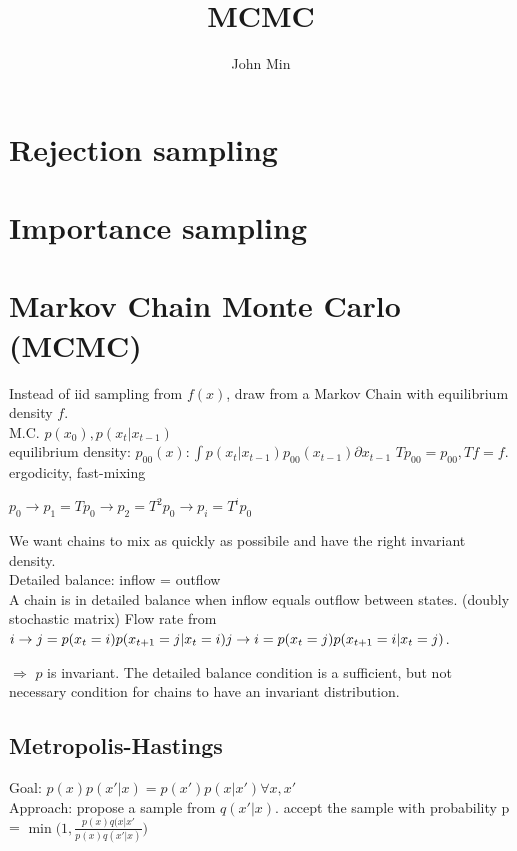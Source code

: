 \documentclass{article}
\author{John Min}
\title{MCMC}
\newcommand{\dx}{\partial x}
\begin{document}
\maketitle

\section{Rejection sampling}

\section{Importance sampling}

\section{Markov Chain Monte Carlo (MCMC)}

Instead of iid sampling from $f(x)$, draw from a Markov Chain with equilibrium density $f$. \\

\noindent
M.C.
$p(x_0), p(x_t | x_{t-1})$ \\
equilibrium density:  $ p_{00}(x): \int p(x_t | x_{t-1}) p_{00}(x_{t-1}) \dx_{t-1} $
$T p_{00} = p_{00}, Tf = f$. 
ergodicity, fast-mixing

$p_0 \rightarrow p_1 = T p_0 \rightarrow p_2 = T^2 p_0 \rightarrow p_i = T^i p_0$

\noindent
We want chains to mix as quickly as possibile and have the right invariant density. \\

\noindent
Detailed balance:  inflow = outflow \\
A chain is in detailed balance when inflow equals outflow between states.  (doubly stochastic matrix)
Flow rate from $i \rightarrow j = p(x_t = i) p(x_{t+1} = j | x_t = i) \\
j \rightarrow i = p(x_t = j) p(x_{t+1} = i | x_t = j) $.

$\Rightarrow $ $p$ is invariant.
The detailed balance condition is a sufficient, but not necessary condition for chains to have an invariant distribution.

\subsection{Metropolis-Hastings}
Goal:  $p(x) p(x' | x) = p(x') p(x | x') \forall x, x'$ \\
Approach:  propose a sample from $q(x' | x)$.
		  accept the sample with probability p = $\min \Big(1, \frac{p(x) q(x | x'}{p(x) q (x' | x)} \Big)$ \\
\end{document}
